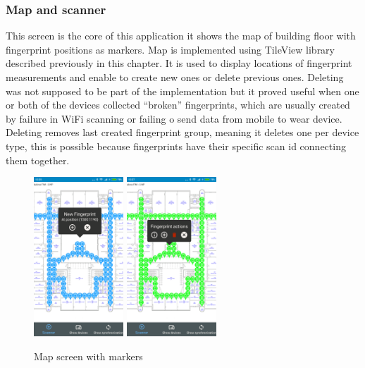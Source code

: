 \subsubsection{Map and scanner}\label{subsec:MapAndScanner}
This screen is the core of this application it shows the map of building floor with fingerprint positions as markers. Map is implemented using TileView library described previously in this chapter. It is used to display locations of fingerprint measurements and enable to create new ones or delete previous ones. Deleting was not supposed to be part of the implementation but it proved useful when one or both of the devices collected \enquote{broken} fingerprints, which are usually created by failure in WiFi scanning or failing o send data from mobile to wear device. Deleting removes last created fingerprint group, meaning it deletes one per device type, this is possible because fingerprints have their specific scan id connecting them together.

\begin{figure}[h!]
	\begin{centering}
		\includegraphics[width=0.30\textwidth]{img/map_markers}
		\includegraphics[width=0.30\textwidth]{img/map_markers_own}
		\par\end{centering}
	\caption{Map screen with markers\label{fig:map_with_markers}}
	\label{fig04c05}
\end{figure}

